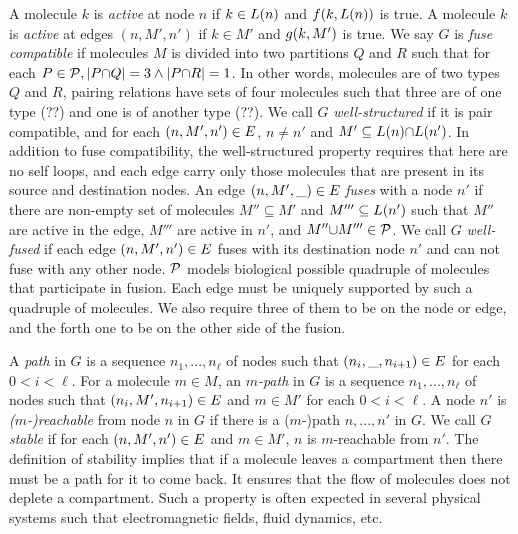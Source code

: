 %
A molecule $k$ is {\em active} at node $n$ if $k \in L(n)$ and
$f(k,L(n))$ is true.
%
A molecule $k$ is {\em active} at edges $(n,M',n')$ if $k \in M'$ and
$g(k,M')$ is true.
%
We say $G$ is {\em fuse compatible} if molecules $M$ is divided into
two partitions $Q$ and $R$ such that
for each $P \in \mathcal{P}, |P {\cap} Q| = 3 \land |P {\cap} R| = 1 $.
%
In other words,
molecules are of two types $Q$ and $R$,
%
pairing relations have sets of four molecules such that three
are of one type (??) and one is of another type (??).
%
%
We call $G$ {\em well-structured} if it is pair compatible, and
for each $(n,M',n') \in E$, $n \neq n'$ and
$M' \subseteq L(n) {\cap} L(n')$.
%
In addition to fuse compatibility, the well-structured property requires that
here are no self loops, and 
each edge carry only those molecules that are present in its source
and destination nodes.
%
An edge $(n,M',\_) \in E$ {\em fuses} with a node $n'$
if there are non-empty set of molecules $M'' \subseteq M'$ and $M''' \subseteq L(n')$
such that $M''$ are active in the edge, $M'''$ are active in $n'$, and $M'' {\cup} M''' \in \mathcal{P}$.
%
We call $G$ {\em well-fused} if each edge $(n,M',n') \in E$ fuses
with its destination node $n'$
and can not fuse with any other node.
%
$\mathcal{P}$ models biological possible quadruple of molecules that participate in fusion.
%
Each edge must be uniquely supported by such a quadruple of molecules.
%
We also require three of them to be on the node or edge, and the forth one
to be on the other side of the fusion.


%

A {\em path} in $G$ is a sequence $n_1,...,n_\ell$ of nodes 
such that $(n_i,\_,n_{i+1}) \in E$ for each $ 0 < i < \ell$.
%
For a molecule $m \in M$,
an {\em $m$-path} in $G$ is a sequence $n_1,...,n_\ell$ of nodes 
such that $(n_i,M',n_{i+1}) \in E$ and $m \in M'$ for
each $ 0 < i < \ell$.
%
A node $n'$ is {\em ($m$-)reachable} from node $n$ in $G$ if there is a ($m$-)path
$n,...,n'$ in $G$.
%
%
We call $G$ {\em stable} if for each $(n,M',n') \in E$ and $m \in M'$,
$n$ is $m$-reachable from $n'$.
%
The definition of stability implies that if a molecule leaves a
compartment then there must be a path for it to come back.
%
It ensures that the flow of molecules does not deplete a
compartment.
%
Such a property is often expected in several physical systems
such that electromagnetic fields, fluid dynamics, etc.

